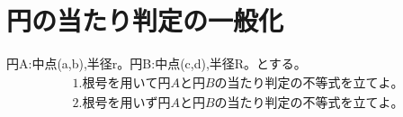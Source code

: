 \documentclass[paper=b4j,landscape,twocolumn,fleqn]{jlreq}
\begin{document}
\section{円の当たり判定の一般化}
円A:中点(a,b),半径r。円B:中点(c,d),半径R。とする。
\begin{align*}
　&1.　根号を用いて円Aと円Bの当たり判定の不等式を立てよ。\\[1em]
　&2.　根号を用いず円Aと円Bの当たり判定の不等式を立てよ。\\[1em]
\end{align*}
\end{document}
